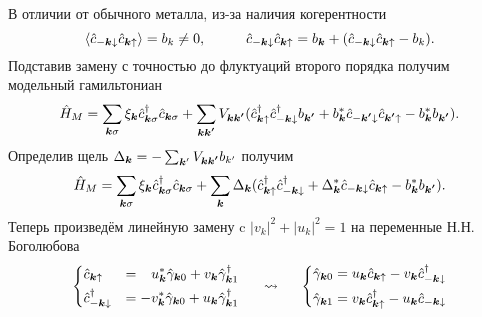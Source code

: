 

В отличии от обычного металла, из-за наличия когерентности
\begin{equation*}
	\langle \hat{c}_{-{\boldsymbol{k}}\downarrow}\hat{c}_{{\boldsymbol{k}}\uparrow} \rangle  = b_k \neq 0,
	\hspace{1 cm}
	\hat{c}_{-{\boldsymbol{k}}\downarrow}\hat{c}_{{\boldsymbol{k}}\uparrow} = b_{{\boldsymbol{k}}} + (\hat{c}_{-{\boldsymbol{k}}\downarrow}\hat{c}_{{\boldsymbol{k}}\uparrow}  - b_k).
\end{equation*}
Подставив замену с точностью до флуктуаций второго порядка получим модельный гамильтониан
\begin{equation*}
	\hat{H}_M = \sum_{{\boldsymbol{k}} \sigma} \xi_{{\boldsymbol{k}}} \hat{c}_{{\boldsymbol{k}} \sigma}^\dagger \hat{c}_{{\boldsymbol{k}} \sigma}
	+
	\sum_{{\boldsymbol{k}} {\boldsymbol{k'}}} V_{{\boldsymbol{k}} {\boldsymbol{k'}}} (\hat{c}_{{\boldsymbol{k}}\uparrow}^\dagger \hat{c}_{-{\boldsymbol{k}}\downarrow}^\dagger b_{{\boldsymbol{k'}}} + b_{{\boldsymbol{k}}}^* \hat{c}_{-{\boldsymbol{k'}}\downarrow} \hat{c}_{{\boldsymbol{k'}}\uparrow} - b_{{\boldsymbol{k}}}^* b_{{\boldsymbol{k'}}}).
\end{equation*}
Определив щель $\Delta_{{\boldsymbol{k}}} = - \sum_{{\boldsymbol{k}}'} V_{{\boldsymbol{k}} {\boldsymbol{k'}}} b_{k'}$ получим
\begin{equation*}
	\hat{H}_M = \sum_{{\boldsymbol{k}} \sigma} \xi_{{\boldsymbol{k}}} \hat{c}_{{\boldsymbol{k}} \sigma}^\dagger \hat{c}_{{\boldsymbol{k}} \sigma}
	+
	\sum_{{\boldsymbol{k}}} \Delta_{{\boldsymbol{k}}}(\hat{c}_{{\boldsymbol{k}}\uparrow}^\dagger \hat{c}_{-{\boldsymbol{k}}\downarrow}^\dagger + \Delta_{{\boldsymbol{k}}}^* \hat{c}_{-{\boldsymbol{k}}\downarrow} \hat{c}_{{\boldsymbol{k}}\uparrow} - b_{{\boldsymbol{k}}}^* b_{{\boldsymbol{k'}}}).
\end{equation*}
Теперь произведём линейную замену c $|v_k|^2 + |u_k|^2 = 1$ на переменные Н.Н. Боголюбова
\begin{equation*}
\left\{
	\begin{aligned}
		&\hat{c}_{{\boldsymbol{k}} \uparrow} &= \phantom{-} u_{{\boldsymbol{k}}}^* \hat{\gamma}_{{\boldsymbol{k}} 0} + v_{{\boldsymbol{k}}} \hat{\gamma}_{{\boldsymbol{k}} 1}^\dagger \\
		&\hat{c}_{-{\boldsymbol{k}} \downarrow}^\dagger &= -v_{{\boldsymbol{k}}}^* \hat{\gamma}_{{\boldsymbol{k}} 0} + u_{{\boldsymbol{k}}} \hat{\gamma}_{{\boldsymbol{k}} 1}^\dagger	
	\end{aligned}
\right.
\hspace{0.5 cm}
\leadsto
\hspace{0.5 cm}
\left\{
	\begin{aligned}
		\hat{\gamma}_{{\boldsymbol{k}} 0} = u_{{\boldsymbol{k}}} \hat{c}_{{\boldsymbol{k}} \uparrow}- v_{{\boldsymbol{k}}} \hat{c}_{-{\boldsymbol{k}}\downarrow}^\dagger \\
		\hat{\gamma}_{{\boldsymbol{k}} 1} = v_{{\boldsymbol{k}}} \hat{c}_{{\boldsymbol{k}} \uparrow}^\dagger - u_{{\boldsymbol{k}}} \hat{c}_{-{\boldsymbol{k}}\downarrow}
	\end{aligned}
\right.
\end{equation*}
